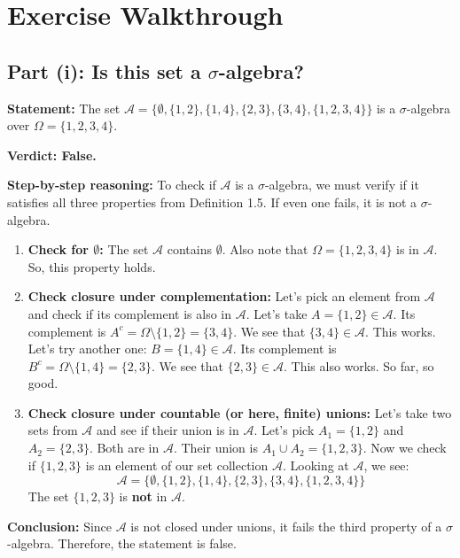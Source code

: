\documentclass[11pt,a4paper]{article}
\begin{document}
\section{Exercise Walkthrough}

\subsection{Part (i): Is this set a \texorpdfstring{$\sigma$}{sigma}-algebra?}
\textbf{Statement:} The set $\mathcal{A} = \{\emptyset, \{1,2\}, \{1,4\}, \{2,3\}, \{3,4\}, \{1,2,3,4\}\}$ is a $\sigma$-algebra over $\Omega = \{1,2,3,4\}$.

\textbf{Verdict: False.}

\textbf{Step-by-step reasoning:}
To check if $\mathcal{A}$ is a $\sigma$-algebra, we must verify if it satisfies all three properties from Definition 1.5. If even one fails, it is not a $\sigma$-algebra.

\begin{enumerate}
    \item \textbf{Check for $\emptyset$:} The set $\mathcal{A}$ contains $\emptyset$. Also note that $\Omega = \{1,2,3,4\}$ is in $\mathcal{A}$. So, this property holds.

    \item \textbf{Check closure under complementation:} Let's pick an element from $\mathcal{A}$ and check if its complement is also in $\mathcal{A}$.
    Let's take $A = \{1,2\} \in \mathcal{A}$. Its complement is $A^c = \Omega \setminus \{1,2\} = \{3,4\}$. We see that $\{3,4\} \in \mathcal{A}$. This works.
    Let's try another one: $B = \{1,4\} \in \mathcal{A}$. Its complement is $B^c = \Omega \setminus \{1,4\} = \{2,3\}$. We see that $\{2,3\} \in \mathcal{A}$. This also works.
    So far, so good.

    \item \textbf{Check closure under countable (or here, finite) unions:} Let's take two sets from $\mathcal{A}$ and see if their union is in $\mathcal{A}$.
    Let's pick $A_1 = \{1,2\}$ and $A_2 = \{2,3\}$. Both are in $\mathcal{A}$.
    Their union is $A_1 \cup A_2 = \{1,2,3\}$.
    Now we check if $\{1,2,3\}$ is an element of our set collection $\mathcal{A}$. Looking at $\mathcal{A}$, we see:
    \[ \mathcal{A} = \{\emptyset, \{1,2\}, \{1,4\}, \{2,3\}, \{3,4\}, \{1,2,3,4\}\} \]
    The set $\{1,2,3\}$ is \textbf{not} in $\mathcal{A}$.
\end{enumerate}

\textbf{Conclusion:} Since $\mathcal{A}$ is not closed under unions, it fails the third property of a $\sigma$-algebra. Therefore, the statement is false.
\end{document}
